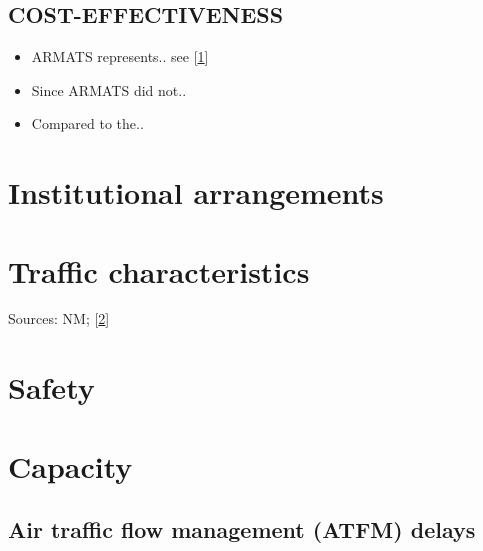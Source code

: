 \documentclass[]{article}
\begin{document}
\hypertarget{cost-effectiveness}{%
\subsection*{COST-EFFECTIVENESS}\label{cost-effectiveness}}

\begin{itemize}
\item
  ARMATS represents.. see {[}\protect\hyperlink{ref-pru:ace-report-2015}{1}{]}
\item
  Since ARMATS did not..
\item
  Compared to the..
\end{itemize}

\newpage

\tableofcontents

\newpage

\listoffigures

\newpage

\hypertarget{institutional-arrangements}{%
\section{Institutional arrangements}\label{institutional-arrangements}}

\newpage

\hypertarget{traffic-characteristics}{%
\section{Traffic characteristics}\label{traffic-characteristics}}

Sources: NM; {[}\protect\hyperlink{ref-7year-forecast-2019}{2}{]}

\newpage

\hypertarget{safety-1}{%
\section{Safety}\label{safety-1}}

\newpage

\hypertarget{capacity-1}{%
\section{Capacity}\label{capacity-1}}

\hypertarget{air-traffic-flow-management-atfm-delays}{%
\subsection{Air traffic flow management (ATFM) delays}\label{air-traffic-flow-management-atfm-delays}}
\end{document}
